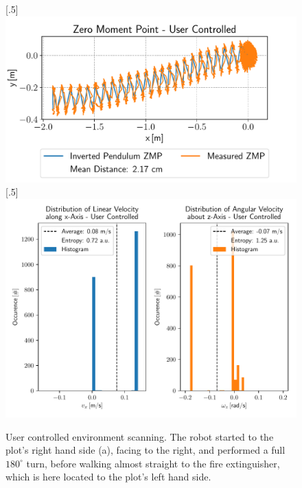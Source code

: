 \begin{figure}[h!]
	[.5\linewidth]{\includegraphics[scale=.45]{chapters/05_experiments/01_user_controlled_walking/02_test_environment/out_of_sight_walk_01_zmp.pdf}}
	[.5\linewidth]{\includegraphics[scale=.45]{chapters/05_experiments/01_user_controlled_walking/02_test_environment/out_of_sight_walk_01_entropy.pdf}}
	\caption{User controlled environment scanning. The robot started to the plot's right hand side (a), facing to the right, and performed a full $180^\circ$ turn, before walking almost straight to the fire extinguisher, which is here located to the plot's left hand side.}
	\label{fig::512_uc_sight}
\end{figure} 
\newpage